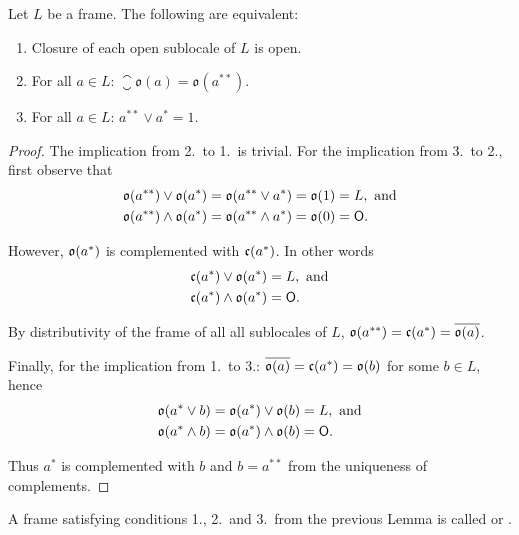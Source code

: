 \begin{lemma}
    Let $L$ be a frame. The following are equivalent:

    \begin{enumerate}
        \item Closure of each open sublocale of $L$ is open.
        \item For all $a \in L$: $\closure{\mathfrak{o}(a)} = \mathfrak{o}(a^{**})$.
        \item For all $a \in L$: $a^{**} \vee a^* = 1$.
    \end{enumerate}
\end{lemma}
\begin{proof}
    The implication from 2.\ to 1.\ is trivial. For the implication from 3.\ to 2., first observe that
    \begin{align*}
        \mathfrak{o}(a^{**})\vee \mathfrak{o}(a^*) &= \mathfrak{o}(a^{**}\vee a^*) = \mathfrak{o}(1) = L, \text{ and} \\
        \mathfrak{o}(a^{**})\wedge \mathfrak{o}(a^*) &= \mathfrak{o}(a^{**}\wedge a^*) = \mathfrak{o}(0) = \mathsf{O}.
    \end{align*}

    \noindent However, $\mathfrak{o}(a^*)$ is complemented with $\mathfrak{c}(a^*)$. In other words
    \begin{align*}
        \mathfrak{c}(a^*)\vee \mathfrak{o}(a^*) &= L, \text{ and} \\
        \mathfrak{c}(a^*)\wedge \mathfrak{o}(a^*) &= \mathsf{O}.
    \end{align*}

    \noindent By distributivity of the frame of all all sublocales of $L$, $\mathfrak{o}(a^{**}) = \mathfrak{c}(a^*) = \overline{\mathfrak{o}(a)}$.

    Finally, for the implication from 1.\ to 3.: $\overline{\mathfrak{o}(a)} = \mathfrak{c}(a^*) = \mathfrak{o}(b)$ for some $b \in L$, hence
    \begin{align*}
        \mathfrak{o}(a^*\vee b) &= \mathfrak{o}(a^*)\vee   \mathfrak{o}(b) = L, \text{ and} \\
        \mathfrak{o}(a^*\wedge b) &= \mathfrak{o}(a^*)\wedge \mathfrak{o}(b) = \mathsf{O}.
    \end{align*}

    \noindent Thus $a^*$ is complemented with $b$ and $b = a^{**}$ from the uniqueness of complements.
\end{proof}

\begin{definition}
    A frame satisfying conditions 1., 2.\ and 3.\ from the previous Lemma is called  or .
\end{definition}

